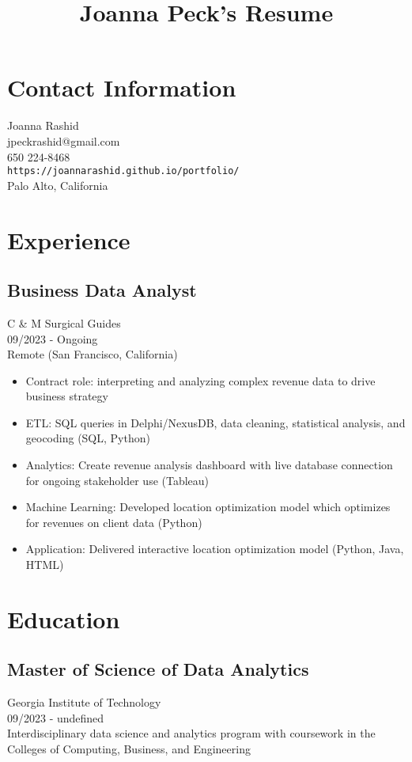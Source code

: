 \documentclass{article}
\begin{document}
\title{Joanna Peck's Resume}
\author{}
\date{}
\maketitle

\section*{Contact Information}
Joanna Rashid \\
jpeckrashid@gmail.com \\
650 224-8468 \\
\texttt{https://joannarashid.github.io/portfolio/} \\
Palo Alto, California

\section*{Experience}
\subsection*{Business Data Analyst}
C \& M Surgical Guides \\
09/2023 - Ongoing \\
Remote (San Francisco, California)
\begin{itemize}[leftmargin=*]
    \item Contract role: interpreting and analyzing complex revenue data to drive business strategy
    \item ETL: SQL queries in Delphi/NexusDB, data cleaning, statistical analysis, and geocoding (SQL, Python)
    \item Analytics: Create revenue analysis dashboard with live database connection for ongoing stakeholder use (Tableau)
    \item Machine Learning: Developed location optimization model which optimizes for revenues on client data (Python)
    \item Application: Delivered interactive location optimization model (Python, Java, HTML)
\end{itemize}

\section*{Education}
\subsection*{Master of Science of Data Analytics}
Georgia Institute of Technology \\
09/2023 - undefined \\
Interdisciplinary data science and analytics program with coursework in the Colleges of Computing, Business, and Engineering
\end{document}
